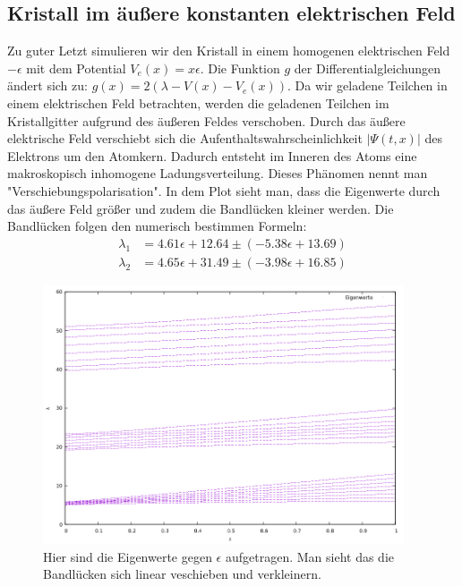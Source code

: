 \documentclass[ngerman]{scrartcl}
\begin{document}
\subsection{Kristall im äußere konstanten elektrischen Feld}
	Zu guter Letzt simulieren wir den Kristall in einem homogenen elektrischen Feld $- \epsilon$ mit dem Potential $V_e(x) = x \epsilon$.
	Die Funktion $g$ der Differentialgleichungen ändert sich zu: $g(x) = 2(\lambda - V(x) - V_e(x))$.
	Da wir geladene Teilchen in einem elektrischen Feld betrachten, werden die geladenen Teilchen im Kristallgitter aufgrund des äußeren Feldes verschoben.
	Durch das äußere elektrische Feld verschiebt sich die Aufenthaltswahrscheinlichkeit ${|\Psi(t,x)|}$ des Elektrons um den Atomkern.
	Dadurch entsteht im Inneren des Atoms eine makroskopisch inhomogene Ladungsverteilung.
	Dieses Phänomen nennt man "Verschiebungspolarisation".
	In dem Plot sieht man, dass die Eigenwerte durch das äußere Feld größer und zudem die Bandlücken kleiner werden.
	Die Bandlücken folgen den numerisch bestimmen Formeln:
	\begin{align*}
		\lambda_1&= 4.61\epsilon+12.64\pm(-5.38\epsilon+13.69)\\
		\lambda_2&= 4.65\epsilon+31.49\pm(-3.98\epsilon+16.85)
	\end{align*}
	\begin{figure}[htbp]
		\centering
		\includegraphics[width=0.95\textwidth]{code/epsilon_plot.png}
		\caption[$f{ext}$]{
			Hier sind die Eigenwerte gegen $\epsilon$ aufgetragen.
			Man sieht das die Bandlücken sich linear veschieben und verkleinern.
			}
		\label{fig:8.1}
	\end{figure}
\end{document}
